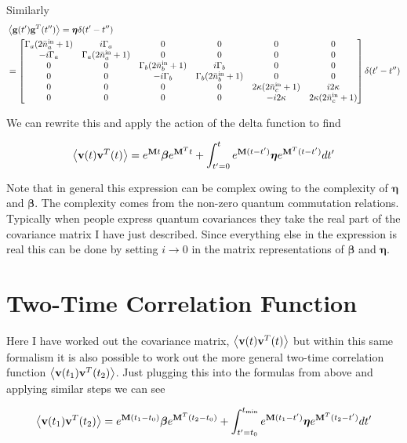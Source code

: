\documentclass[12pt]{article}
\newcommand{\bv}[1]{\bold{#1}}
\newcommand{\bs}[1]{\boldsymbol{#1}}
\begin{document}
Similarly
\begin{align}
&\Braket{\bv{g}(t')\bv{g}^T(t'')}=\boldsymbol{\eta}\delta(t'-t'')\\
&=
\begin{bmatrix}
\Gamma_a (2\bar{n}^{\text{in}}_a+1) & i\Gamma_a & 0 & 0 & 0 & 0\\
-i\Gamma_a & \Gamma_a(2\bar{n}^{\text{in}}_a+1) & 0 & 0 & 0 & 0\\
0 & 0 & \Gamma_b(2\bar{n}^{\text{in}}_b+1) & i\Gamma_b & 0 & 0\\
0 & 0 & -i\Gamma_b & \Gamma_b(2\bar{n}^{\text{in}}_b+1) & 0 & 0\\
0 & 0 & 0 & 0 & 2\kappa(2\bar{n}^{\text{in}}_c+1) & i2\kappa\\
0 & 0 & 0 & 0 & -i2\kappa & 2\kappa(2\bar{n}^{\text{in}}_c+1)\\
\end{bmatrix}
\delta(t'-t'')
\end{align}

We can rewrite this and apply the action of the delta function to find

\begin{equation}
\Braket{\bv{v}(t)\bv{v}^T(t)} = e^{\bv{M}t} \boldsymbol{\beta} e^{\bv{M}^T t} + \int_{t'=0}^t e^{\bv{M}(t-t')} \boldsymbol{\eta} e^{\bv{M}^T (t-t')} dt'
\end{equation}

Note that in general this expression can be complex owing to the complexity of $\boldsymbol{\eta}$ and $\boldsymbol{\beta}$. The complexity comes from the non-zero quantum commutation relations. Typically when people express quantum covariances they take the real part of the covariance matrix I have just described. Since everything else in the expression is real this can be done by setting $i\rightarrow 0$ in the matrix representations of $\boldsymbol{\beta}$ and $\boldsymbol{\eta}$.

\section{Two-Time Correlation Function}

Here I have worked out the covariance matrix, $\Braket{\bv{v}(t)\bv{v}^T(t)}$ but within this same formalism it is also possible to work out the more general two-time correlation function $\Braket{\bv{v}(t_1)\bv{v}^T(t_2)}$. Just plugging this into the formulas from above and applying similar steps we can see 

\begin{equation}
\Braket{\bv{v}(t_1)\bv{v}^T(t_2)} = e^{\bv{M}(t_1-t_0)} \bs{\beta} e^{\bv{M}^T (t_2-t_0)} + \int_{t'=t_0}^{t_{\text{min}}} e^{\bv{M}(t_1-t')} \bs{\eta} e^{\bv{M}^T (t_2-t')} dt'
\end{equation}
\end{document}
